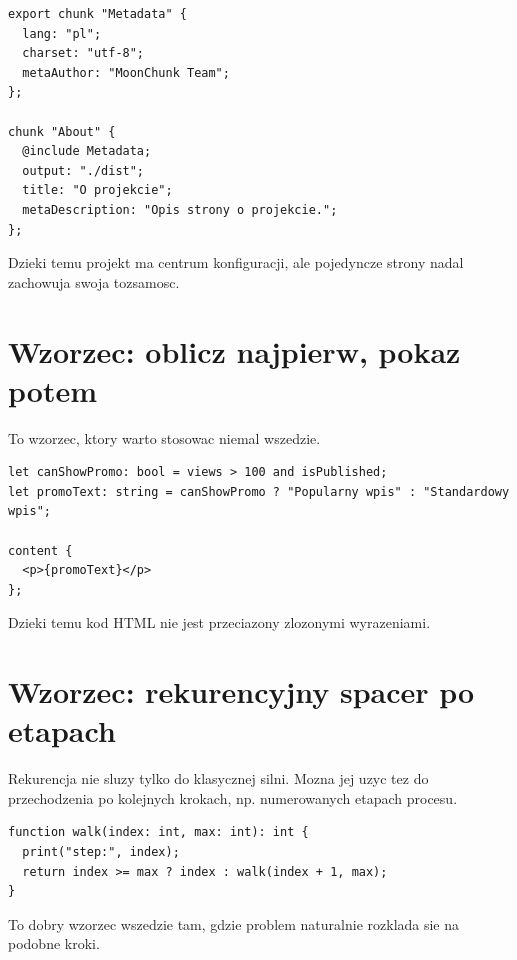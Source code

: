 \begin{lstlisting}[style=moonchunk,caption={Wspolne metadata i lokalne doprecyzowanie}]
export chunk "Metadata" {
  lang: "pl";
  charset: "utf-8";
  metaAuthor: "MoonChunk Team";
};

chunk "About" {
  @include Metadata;
  output: "./dist";
  title: "O projekcie";
  metaDescription: "Opis strony o projekcie.";
};
\end{lstlisting}

Dzieki temu projekt ma centrum konfiguracji, ale pojedyncze strony nadal zachowuja
swoja tozsamosc.

\section{Wzorzec: oblicz najpierw, pokaz potem}
To wzorzec, ktory warto stosowac niemal wszedzie.

\begin{lstlisting}[style=moonchunk,caption={Oddzielenie logiki od prezentacji}]
let canShowPromo: bool = views > 100 and isPublished;
let promoText: string = canShowPromo ? "Popularny wpis" : "Standardowy wpis";

content {
  <p>{promoText}</p>
};
\end{lstlisting}

Dzieki temu kod HTML nie jest przeciazony zlozonymi wyrazeniami.

\section{Wzorzec: rekurencyjny spacer po etapach}
Rekurencja nie sluzy tylko do klasycznej silni. Mozna jej uzyc tez do przechodzenia po
kolejnych krokach, np. numerowanych etapach procesu.

\begin{lstlisting}[style=moonchunk,caption={Rekurencja jako przechodzenie po krokach}]
function walk(index: int, max: int): int {
  print("step:", index);
  return index >= max ? index : walk(index + 1, max);
}
\end{lstlisting}

To dobry wzorzec wszedzie tam, gdzie problem naturalnie rozklada sie na podobne kroki.
